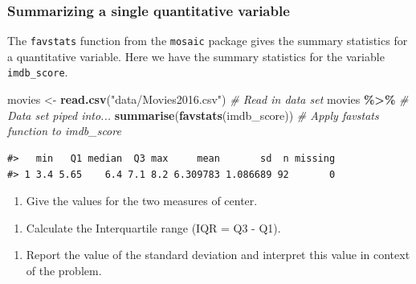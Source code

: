 \documentclass[
]{report}
\newenvironment{Shaded}{\begin{snugshade}}{\end{snugshade}}
\newcommand{\CommentTok}[1]{\textcolor[rgb]{0.56,0.35,0.01}{\textit{#1}}}
\newcommand{\KeywordTok}[1]{\textcolor[rgb]{0.13,0.29,0.53}{\textbf{#1}}}
\newcommand{\NormalTok}[1]{#1}
\newcommand{\OperatorTok}[1]{\textcolor[rgb]{0.81,0.36,0.00}{\textbf{#1}}}
\newcommand{\StringTok}[1]{\textcolor[rgb]{0.31,0.60,0.02}{#1}}
\providecommand{\tightlist}{%
  \setlength{\itemsep}{0pt}\setlength{\parskip}{0pt}}
\begin{document}
\vspace{.5in}

\hypertarget{summarizing-a-single-quantitative-variable}{%
\subsubsection*{Summarizing a single quantitative variable}\label{summarizing-a-single-quantitative-variable}}

The \texttt{favstats} function from the \texttt{mosaic} package gives the summary statistics for a quantitative variable. Here we have the summary statistics for the variable \texttt{imdb\_score}.

\begin{Shaded}
\begin{Highlighting}[]
\NormalTok{movies \textless{}{-}}\StringTok{ }\KeywordTok{read.csv}\NormalTok{(}\StringTok{"data/Movies2016.csv"}\NormalTok{) }\CommentTok{\# Read in data set}
\NormalTok{movies }\OperatorTok{\%\textgreater{}\%}\StringTok{ }\CommentTok{\# Data set piped into...}
\StringTok{  }\KeywordTok{summarise}\NormalTok{(}\KeywordTok{favstats}\NormalTok{(imdb\_score)) }\CommentTok{\# Apply favstats function to imdb\_score}
\end{Highlighting}
\end{Shaded}

\begin{verbatim}
#>   min   Q1 median  Q3 max     mean       sd  n missing
#> 1 3.4 5.65    6.4 7.1 8.2 6.309783 1.086689 92       0
\end{verbatim}

\begin{enumerate}
\def\labelenumi{\arabic{enumi}.}
\setcounter{enumi}{3}
\tightlist
\item
  Give the values for the two measures of center.
\end{enumerate}

\vspace{0.5in}

\begin{enumerate}
\def\labelenumi{\arabic{enumi}.}
\setcounter{enumi}{4}
\tightlist
\item
  Calculate the Interquartile range (IQR = Q3 - Q1).
\end{enumerate}

\vspace{0.5in}

\begin{enumerate}
\def\labelenumi{\arabic{enumi}.}
\setcounter{enumi}{5}
\tightlist
\item
  Report the value of the standard deviation and interpret this value in context of the problem.
  \vspace{1in}
\end{enumerate}
\end{document}
